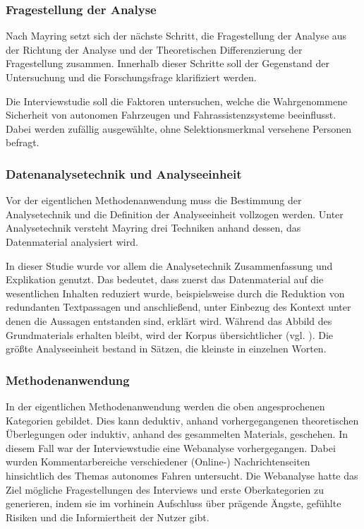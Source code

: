 \documentclass[12pt]{article}
\begin{document}
\subsubsection*{Fragestellung der Analyse}
Nach Mayring setzt sich der nächste Schritt, die \glq Fragestellung der Analyse\grq{} aus der \glq Richtung der Analyse\grq{} und der \glq Theoretischen Differenzierung der Fragestellung\grq{} zusammen. Innerhalb dieser Schritte soll der Gegenstand der Untersuchung und die Forschungsfrage klarifiziert werden.

Die Interviewstudie soll die Faktoren untersuchen, welche die Wahrgenommene Sicherheit von autonomen Fahrzeugen und Fahrassistenzsysteme beeinflusst. Dabei werden zufällig ausgewählte, ohne Selektionsmerkmal versehene Personen befragt.

\subsubsection*{Datenanalysetechnik und Analyseeinheit}
Vor der eigentlichen Methodenanwendung muss die \glq Bestimmung der Analysetechnik\grq{} und die \glq Definition der Analyseeinheit\grq{} vollzogen werden. Unter Analysetechnik versteht Mayring drei Techniken anhand dessen, das Datenmaterial analysiert wird.

In dieser Studie wurde vor allem die Analysetechnik \glq Zusammenfassung\grq{} und \glq Explikation\grq{} genutzt. Das bedeutet, dass zuerst das Datenmaterial auf die wesentlichen Inhalten reduziert wurde, beispielsweise durch die Reduktion von redundanten Textpassagen und anschließend, unter Einbezug des Kontext unter denen die Aussagen entstanden sind, erklärt wird. Während das \glq Abbild des Grundmaterials\grq{} erhalten bleibt, wird der Korpus übersichtlicher (vgl. \cite[115]{mayring2010qualitative}). Die größte Analyseeinheit bestand in Sätzen, die kleinste in einzelnen Worten.

\subsubsection*{Methodenanwendung}
In der eigentlichen Methodenanwendung werden die oben angesprochenen Kategorien gebildet. Dies kann deduktiv, anhand vorhergegangenen theoretischen Überlegungen oder induktiv, anhand des gesammelten Materials, geschehen.
In diesem Fall war der Interviewstudie eine Webanalyse vorhergegangen. Dabei wurden Kommentarbereiche verschiedener (Online-) Nachrichtenseiten hinsichtlich des Themas autonomes Fahren untersucht. Die Webanalyse hatte das Ziel mögliche Fragestellungen des Interviews und erste Oberkategorien zu generieren, indem sie im vorhinein Aufschluss über prägende Ängste, gefühlte Risiken und die Informiertheit der Nutzer gibt.
\end{document}
